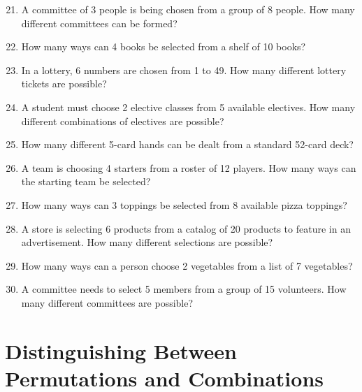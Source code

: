 \documentclass[12pt]{article}
\begin{document}
\begin{enumerate}
\setcounter{enumi}{20}

\item A committee of 3 people is being chosen from a group of 8 people. How many different committees can be formed?

\item How many ways can 4 books be selected from a shelf of 10 books?

\item In a lottery, 6 numbers are chosen from 1 to 49. How many different lottery tickets are possible?

\item A student must choose 2 elective classes from 5 available electives. How many different combinations of electives are possible?

\item How many different 5-card hands can be dealt from a standard 52-card deck?

\item A team is choosing 4 starters from a roster of 12 players. How many ways can the starting team be selected?

\item How many ways can 3 toppings be selected from 8 available pizza toppings?

\item A store is selecting 6 products from a catalog of 20 products to feature in an advertisement. How many different selections are possible?

\item How many ways can a person choose 2 vegetables from a list of 7 vegetables?

\item A committee needs to select 5 members from a group of 15 volunteers. How many different committees are possible?

\end{enumerate}

\section{Distinguishing Between Permutations and Combinations}
\end{document}
